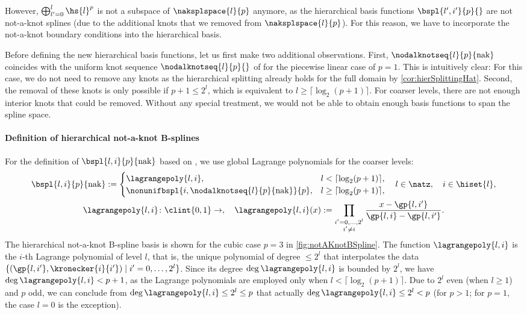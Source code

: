 However, $\bigoplus_{l'=0}^l \hs{l}^p$ is not a subspace of
$\naksplspace{l}{p}$ anymore,
as the hierarchical basis functions $\bspl{l',i'}{p}{}$ are not
not-a-knot splines (due to the additional knots that we removed from
$\naksplspace{l}{p}$).
For this reason,
we have to incorporate the not-a-knot boundary conditions into the
hierarchical basis.

Before defining the new hierarchical basis functions,
let us first make two additional observations.
First, $\nodalknotseq{l}{p}{\nak}$ coincides with the
uniform knot sequence $\nodalknotseq{l}{p}{}$ of 
for the piecewise linear case of $p = 1$.
This is intuitively clear:
For this case,
we do not need to remove any knots as the hierarchical splitting already
holds for the full domain by \cref{cor:hierSplittingHat}.
Second, the removal of these knots is only possible if $p + 1 \le 2^l$,
which is equivalent to $l \ge \lceil\log_2(p+1)\rceil$.
For coarser levels,
there are not enough interior knots that could be removed.
Without any special treatment,
we would not be able to obtain enough basis functions to span the spline space.

\paragraph{Definition of hierarchical not-a-knot B-splines}

For the definition of 
$\bspl{l,i}{p}{\nak}$ based on ,
we use global Lagrange polynomials for the coarser levels:
\begin{subequations}
  \begin{gather}
    \bspl{l,i}{p}{\nak}
    :=
    \begin{cases}
      \lagrangepoly{l,i},&
      l < \lceil\log_2(p+1)\rceil,\\
      \nonunifbspl{i,\nodalknotseq{l}{p}{\nak}}{p},&
      l \ge \lceil\log_2(p+1)\rceil,
    \end{cases}\quad
    l \in \natz,\quad
    i \in \hiset{l},\\
    \lagrangepoly{l,i}\colon \clint{0, 1} \to \real,\quad
    \lagrangepoly{l,i}(x)
    := \prod_{\substack{i'=0,\dotsc,2^l\\i'\not=i}}
    \frac{x - \gp{l,i'}}{\gp{l,i} - \gp{l,i'}}.
  \end{gather}
\end{subequations}
The hierarchical not-a-knot B-spline basis is shown for the
cubic case $p = 3$ in \cref{fig:notAKnotBSpline}.
The function $\lagrangepoly{l,i}$ is the $i$-th Lagrange polynomial of level $l$,
that is,
the unique polynomial of degree $\le 2^l$ that interpolates the data
$\{(\gp{l,i'}, \kronecker{i}{i'}) \mid i' = 0, \dotsc, 2^l\}$.
Since its degree $\deg \lagrangepoly{l,i}$ is bounded by $2^l$,
we have $\deg \lagrangepoly{l,i} < p + 1$,
as the Lagrange polynomials are employed only when
$l < \lceil\log_2(p+1)\rceil$.
Due to $2^l$ even (when $l \ge 1$) and $p$ odd,
we can conclude from $\deg \lagrangepoly{l,i} \le 2^l \le p$ that actually
$\deg \lagrangepoly{l,i} \le 2^l < p$
(for $p > 1$; for $p = 1$, the case $l = 0$ is the exception).


